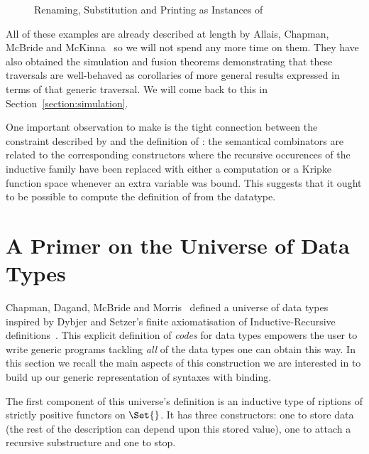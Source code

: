 \begin{figure}[h]
\begin{minipage}{0.40\textwidth}
\end{minipage}\hspace{1em}
\begin{minipage}{0.50\textwidth}
\end{minipage}
\caption{Renaming, Substitution and Printing as Instances of }
\end{figure}

All of these examples are already described at length by Allais, Chapman,
McBride and McKinna~\citeyear{allais2017type} so we will not spend any
more time on them. They have also obtained the simulation and fusion
theorems demonstrating that these traversals are well-behaved as
corollaries of more general results expressed in terms of that generic
traversal. We will come back to this in Section~\ref{section:simulation}.

One important observation to make is the tight connection between the
constraint described by  and the definition of : the
semantical combinators are related to the corresponding constructors
where the recursive occurences of the inductive family have been replaced
with either a computation or a Kripke function space whenever an
extra variable was bound. This suggests that it ought to be possible
to compute the definition of  from the datatype.

\section{A Primer on the Universe of Data Types}

Chapman, Dagand, McBride and Morris~\citeyear{Chapman:2010:GAL:1863543.1863547}
defined a universe of data types inspired by Dybjer and Setzer's
finite axiomatisation of Inductive-Recursive definitions~\citeyear{Dybjer1999}.
This explicit definition of \emph{codes} for data types empowers the
user to write generic programs tackling \emph{all} of the data types
one can obtain this way. In this section we recall the main aspects
of this construction we are interested in to build up our generic
representation of syntaxes with binding.

The first component of this universe's definition is an inductive type
of riptions of strictly positive functors on $\Set{}$. It has
three constructors: one to store data (the rest of the description can
depend upon this stored value), one to attach a recursive substructure
and one to stop.

